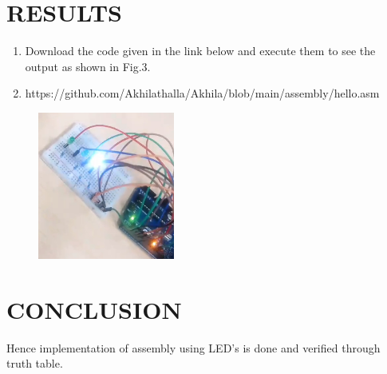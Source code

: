 \documentclass[conference]{IEEEtran}
\begin{document}
 \section{RESULTS}
 \begin{enumerate}
 \item Download the code given in the link below and execute them to see the output as shown in Fig.3.
 \item https://github.com/Akhilathalla/Akhila/blob/main/assembly/hello.asm
 \end{enumerate}
 \begin{figure}[h]
 \centering
 \includegraphics[width=0.4\textwidth]{3.jpg}
 \caption{\label{fig-2:Gates}}               
\end{figure}

\section{CONCLUSION}
 Hence implementation of assembly using LED's is done and verified through truth table.

 
\end{document}

